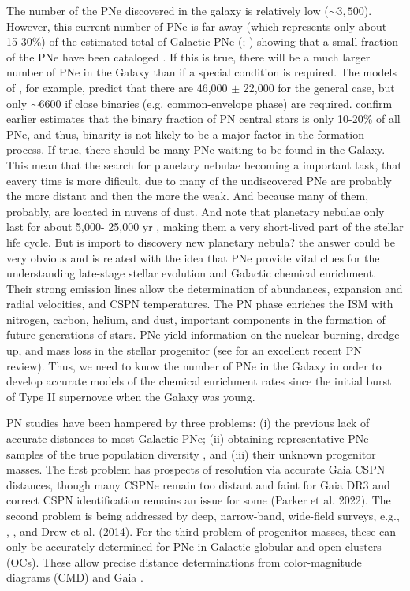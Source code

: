 \documentclass[fleqn,usenatbib]{mnras}
\begin{document}
The number of the PNe discovered in the galaxy is relatively low (\(\sim 3,500\)). However,
this current number of PNe is far away (which represents only about 15-30\%) of the estimated
total of Galactic PNe (\citealp{Frew:2008}; \citealp{Jacoby:2010}) showing that a small fraction
of the PNe have been cataloged \citep{Frew:2017}. If this is true, there will be a much larger
number of PNe in the Galaxy than if a special condition
is required. The models of \citet{Moe:2006}, for
example, predict that there are 46,000 $\pm$ 22,000 for the general case,
but only $\sim$6600 \citep{Marco:2005} if
close binaries (e.g. common-envelope phase) are required.
\citet{Miszalski:2009} confirm earlier estimates that the
binary fraction of PN central stars is only 10-20\% of all
PNe, and thus, binarity is not likely to be a major factor in
the formation process. If true, there should be many PNe
waiting to be found in the Galaxy. This mean that the search for planetary nebulae
becoming a important task, that eavery time is more dificult, due to many of
the undiscovered PNe are probably
the more distant and then the more the weak. And because many of them, probably, are located
in nuvens of dust. And note that planetary nebulae only last for about 5,000-
25,000 yr \citep{Badenes:2015}, making them a very short-lived part of the stellar life cycle.
But is import to discovery new planetary nebula? the answer could be very obvious and is
related with the idea that PNe provide vital clues for the understanding late-stage stellar
evolution and Galactic chemical enrichment. Their strong emission lines allow the determination
of abundances, expansion and radial velocities, and
CSPN temperatures. The PN phase
enriches the ISM with nitrogen, carbon, helium, and dust,
important components in the formation of future generations
of stars. PNe yield information on the nuclear
burning, dredge up, and mass loss in the stellar progenitor
(see \citealp{Kwitter:2022} for an excellent recent PN
review). Thus, we need to know the number of PNe in
the Galaxy in order to develop accurate models of the
chemical enrichment rates since the initial burst of Type II
supernovae when the Galaxy was young.

PN studies have been hampered by three problems:
(i) the previous lack of accurate distances to most Galactic
PNe; (ii) obtaining representative PNe samples of the true
population diversity \citep{Parker:2022}, and (iii) their unknown
progenitor masses. The first problem has prospects of
resolution via accurate Gaia CSPN distances, though many
CSPNe remain too distant and faint for Gaia DR3 and correct
CSPN identification remains an issue for some (Parker et al.
2022). The second problem is being addressed by deep, narrow-band,
wide-field surveys, e.g., \citet{Parker:2005},
\citet{Drew:2005}, and Drew et al. (2014). For the third problem
of progenitor masses, these can only
be accurately determined for PNe in Galactic globular and
open clusters (OCs). These allow precise distance determinations
from color-magnitude diagrams (CMD) and Gaia \citep{Fragkou:2022}.
\end{document}
